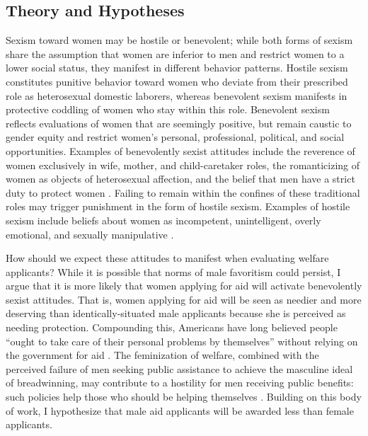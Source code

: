 \documentclass[12pt]{article}%
\begin{document}
\begin{doublespace}
\section*{Theory and Hypotheses}
Sexism toward women may be hostile or benevolent; while both forms of sexism share the assumption that women are inferior to men and restrict women to a lower social status, they manifest in different behavior patterns. Hostile sexism constitutes punitive behavior toward women who deviate from their prescribed role as heterosexual domestic laborers, whereas benevolent sexism manifests in protective coddling of women who stay within this role. Benevolent sexism reflects evaluations of women that are seemingly positive, but remain caustic to gender equity and restrict women's personal, professional, political, and social opportunities. Examples of benevolently sexist attitudes include the reverence of women exclusively in wife, mother, and child-caretaker roles, the romanticizing of women as objects of heterosexual affection, and the belief that men have a strict duty to protect women \citep{chen_gender_2020, geus_understanding_2022}. Failing to remain within the confines of these traditional roles may trigger punishment in the form of hostile sexism. Examples of hostile sexism include beliefs about women as incompetent, unintelligent, overly emotional, and sexually manipulative \citep{mcthomas_growing_2016, cassese_playing_2019}.

How should we expect these attitudes to manifest when evaluating welfare applicants? While it is possible that norms of male favoritism could persist, I argue that it is more likely that women applying for aid will activate benevolently sexist attitudes. That is, women applying for aid will be seen as needier and more deserving than identically-situated male applicants because she is perceived as needing protection. Compounding this, Americans have long believed people ``ought to take care of their personal problems by themselves” without relying on the government for aid \citep{sniderman_coping_1977}. The feminization of welfare, combined with the perceived failure of men seeking public assistance to achieve the masculine ideal of breadwinning, may contribute to a hostility for men receiving public benefits: such policies help those who should be helping themselves \citep{bobocel_justice-based_1998, katz_racial_1988, sniderman_symbolic_1986, sniderman_beyond_1996, mclosky_ethos}. Building on this body of work, I hypothesize that male aid applicants will be awarded less than female applicants.


\end{doublespace}
\end{document}
